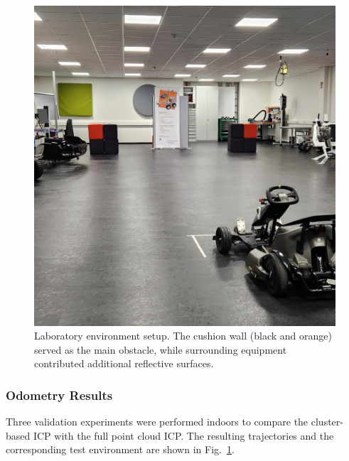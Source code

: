 \begin{figure}[!htbp]
    \centering
    \includegraphics[width=0.75\linewidth]{images/labSetup.png}
    \caption{Laboratory environment setup. The cushion wall (black and orange) served as the main obstacle, while surrounding equipment contributed additional reflective surfaces.}
    \label{fig:lab_setup}
\end{figure}

\subsubsection{Odometry Results}
Three validation experiments were performed indoors to compare the cluster-based ICP with the full point cloud ICP.
The resulting trajectories and the corresponding test environment are shown in Fig.~\ref{fig:lab_setup}.


